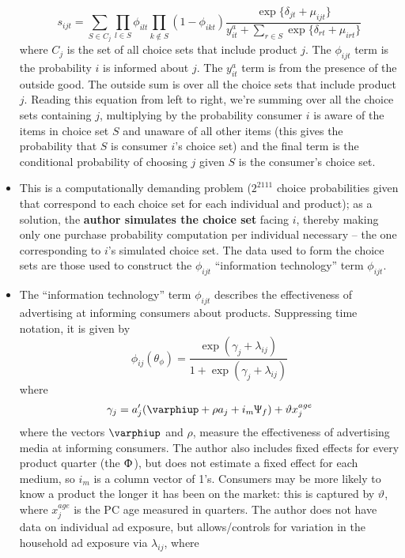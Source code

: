 \documentclass[11pt]{article}
\numberwithin{equation}{section}
\begin{document}
\begin{itemize}
		\begin{equation}
		s_{ijt}=\sum_{S\in C_j}\prod_{l\in S}\phi_{ilt}\prod_{k\notin S}(1-\phi_{ikt}) \frac{\exp\{\delta_{jt} + \mu_{ijt}\}}{y_{it}^a + \sum_{r\in S}\exp\{\delta_{rt} + \mu_{irt}\}}
		\end{equation}
		where $C_j$ is the set of all choice sets that include product $j$. The $\phi_{ijt}$ term is the probability $i$ is informed about $j$. The $y_{it}^a$ term is from the presence of the outside good. The outside sum is over all the choice sets that include product $j$. Reading this equation from left to right, we're summing over all the choice sets containing $j$, multiplying by the probability consumer $i$ is aware of the items in choice set $S$ and unaware of all other items (this gives the probability that $S$ is consumer $i$'s choice set) and the final term is the conditional probability of choosing $j$ given $S$ is the consumer's choice set.
		\item This is a computationally demanding problem ($2^{2111}$ choice probabilities given that correspond to each choice set for each individual and product); as a solution, the \textbf{author simulates the choice set} facing $i$, thereby making only one purchase probability computation per individual necessary -- the one corresponding to $i$'s simulated choice set. The data used to form the choice sets are those used to construct the $\phi_{ijt}$ ``information technology'' term $\phi_{ijt}$.
		\item The ``information technology'' term $\phi_{ijt}$ describes the effectiveness of advertising at informing consumers about products. Suppressing time notation, it is given by
		\begin{equation}
		\phi_{ij}(\theta_{\phi})= \frac{\exp(\gamma_j+\lambda_{ij})}{1 + \exp(\gamma_j+\lambda_{ij})}
		\end{equation}
		where
		\begin{equation}
		\gamma_j=a_j'(\varphiup + \rho a_j + i_m \Uppsi_f) + \vartheta x_j^{age}
		\end{equation}
		where the vectors $\varphiup$ and $\rho$, measure the effectiveness of advertising media at informing consumers. The author also includes fixed effects for every product quarter (the $\Upphi$), but does not estimate a fixed effect for each medium, so $i_m$ is a column vector of 1's. Consumers may be more likely to know a product the longer it has been on the market: this is captured by $\vartheta$, where $x_j^{age}$ is the PC age measured in quarters. The author does not have data on individual ad exposure, but allows/controls for variation in the household ad exposure via $\lambda_{ij}$, where

\end{itemize}
\end{document}

